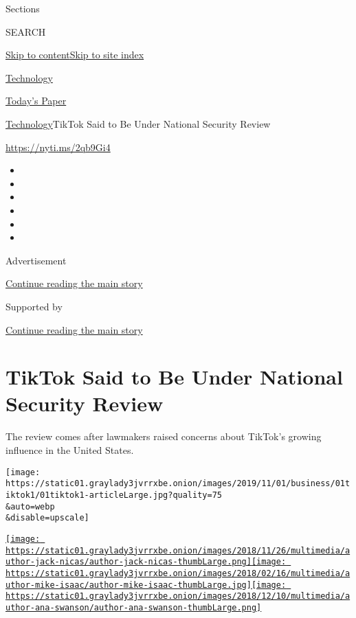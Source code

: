Sections

SEARCH

\protect\hyperlink{site-content}{Skip to
content}\protect\hyperlink{site-index}{Skip to site index}

\href{https://www.nytimes3xbfgragh.onion/section/technology}{Technology}

\href{https://myaccount.nytimes3xbfgragh.onion/auth/login?response_type=cookie\&client_id=vi}{}

\href{https://www.nytimes3xbfgragh.onion/section/todayspaper}{Today's
Paper}

\href{/section/technology}{Technology}\textbar{}TikTok Said to Be Under
National Security Review

\url{https://nyti.ms/2qb9Gi4}

\begin{itemize}
\item
\item
\item
\item
\item
\item
\end{itemize}

Advertisement

\protect\hyperlink{after-top}{Continue reading the main story}

Supported by

\protect\hyperlink{after-sponsor}{Continue reading the main story}

\hypertarget{tiktok-said-to-be-under-national-security-review}{%
\section{TikTok Said to Be Under National Security
Review}\label{tiktok-said-to-be-under-national-security-review}}

The review comes after lawmakers raised concerns about TikTok's growing
influence in the United States.

\texttt{[image: https://static01.graylady3jvrrxbe.onion/images/2019/11/01/business/01tiktok1/01tiktok1-articleLarge.jpg?quality=75\\\&auto=webp\\\&disable=upscale]}

\href{https://www.nytimes3xbfgragh.onion/by/jack-nicas}{\texttt{[image: https://static01.graylady3jvrrxbe.onion/images/2018/11/26/multimedia/author-jack-nicas/author-jack-nicas-thumbLarge.png]}}\href{https://www.nytimes3xbfgragh.onion/by/mike-isaac}{\texttt{[image: https://static01.graylady3jvrrxbe.onion/images/2018/02/16/multimedia/author-mike-isaac/author-mike-isaac-thumbLarge.jpg]}}\href{https://www.nytimes3xbfgragh.onion/by/ana-swanson}{\texttt{[image: https://static01.graylady3jvrrxbe.onion/images/2018/12/10/multimedia/author-ana-swanson/author-ana-swanson-thumbLarge.png]}}

